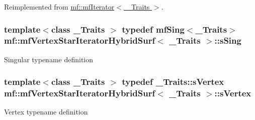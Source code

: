 Reimplemented from \hyperlink{classmf_1_1mfIterator_aca31e4d7e7eca4e3b100530d8725064b}{mf::mfIterator$<$ \_\-Traits $>$}.

\hypertarget{classmf_1_1mfVertexStarIteratorHybridSurf_ad9d3b4599b8c75447e1a84cc9fcade36}{
\subsubsection[{sSing}]{\setlength{\rightskip}{0pt plus 5cm}template$<$class \_\-Traits $>$ typedef {\bf mfSing}$<$\_\-Traits$>$ {\bf mf::mfVertexStarIteratorHybridSurf}$<$ \_\-Traits $>$::{\bf sSing}}}
\label{classmf_1_1mfVertexStarIteratorHybridSurf_ad9d3b4599b8c75447e1a84cc9fcade36}
Singular typename definition \hypertarget{classmf_1_1mfVertexStarIteratorHybridSurf_af127643c84159641fa27dcae42d3827b}{
\subsubsection[{sVertex}]{\setlength{\rightskip}{0pt plus 5cm}template$<$class \_\-Traits $>$ typedef \_\-Traits::sVertex {\bf mf::mfVertexStarIteratorHybridSurf}$<$ \_\-Traits $>$::{\bf sVertex}}}
\label{classmf_1_1mfVertexStarIteratorHybridSurf_af127643c84159641fa27dcae42d3827b}
Vertex typename definition 

